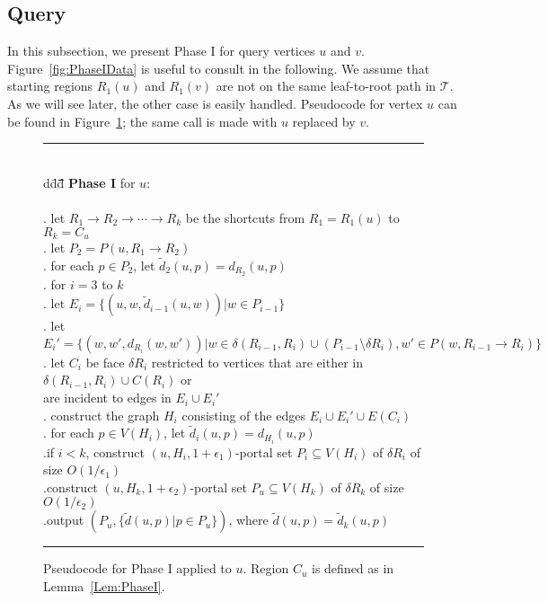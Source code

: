 \documentclass[11pt]{article}
\begin{document}
\subsection{Query}\label{subsec:Query}
In this subsection, we present Phase I for query vertices $u$ and $v$. Figure~\ref{fig:PhaseIData} is useful to consult in the following. We assume that starting regions $R_1(u)$ and $R_1(v)$ are not on the same leaf-to-root path in $\mathcal T$. As we will see later, the other case is easily handled. Pseudocode for vertex $u$ can be found in Figure~\ref{fig:PhaseI}; the same call is made with $u$ replaced by $v$.
\begin{figure}[!ht]
\begin{tabbing}
\rule{\linewidth}{\arrayrulewidth}\\
d\=dd\=\quad\=\quad\=\quad\=\quad\=\quad\=\quad\=\quad\=\quad\=\quad\=\quad\=\quad\=\kill
\>\textbf{Phase I} for $u$:\\\\
. \>\>let $R_1\rightarrow R_2\rightarrow\cdots\rightarrow R_k$ be the shortcuts from $R_1 = R_1(u)$ to $R_k = C_u$\\
. \>\>let $P_2 = P(u,R_1\rightarrow R_2)$\\
. \>\>for each $p\in P_2$, let $\tilde{d}_2(u,p) = d_{R_2}(u,p)$\\
. \>\>for $i = 3$ to $k$\\
. \>\>\>let $E_i = \{(u,w,\tilde{d}_{i-1}(u,w)) | w\in P_{i-1}\}$\\
. \>\>\>let $E_i' = \{(w,w',d_{R_i}(w,w')) | w\in \delta(R_{i-1},R_i)\cup (P_{i-1}\setminus\delta R_i), w'\in P(w,R_{i-1}\rightarrow R_i)\}$\\
. \>\>\>let $C_i$ be face $\delta R_i$ restricted to vertices that are either in $\delta(R_{i-1},R_i)\cup C(R_i)$ or\\
\>   \>\>\>are incident to edges in $E_i\cup E_i'$\\
. \>\>\>construct the graph $H_i$ consisting of the edges $E_i\cup E_i'\cup E(C_i)$\\
. \>\>\>for each $p\in V(H_i)$, let $\tilde{d}_i(u,p) = d_{H_i}(u,p)$\\
.\>\>\>if $i < k$, construct $(u,H_i,1+\epsilon_1)$-portal set $P_i\subseteq V(H_i)$ of $\delta R_i$ of size $O(1/\epsilon_1)$\\
.\>\>construct $(u,H_k,1+\epsilon_2)$-portal set $P_u\subseteq V(H_k)$ of $\delta R_k$ of size $O(1/\epsilon_2)$\\
.\>\>output $(P_u,\{\tilde{d}(u,p)|p\in P_u\})$, where $\tilde{d}(u,p) = \tilde{d}_k(u,p)$\\
\rule{\linewidth}{\arrayrulewidth}
\end{tabbing}
\caption{Pseudocode for Phase I applied to $u$. Region $C_u$ is defined as in Lemma~\ref{Lem:PhaseI}.}\label{fig:PhaseI}
\end{figure}
\end{document}
